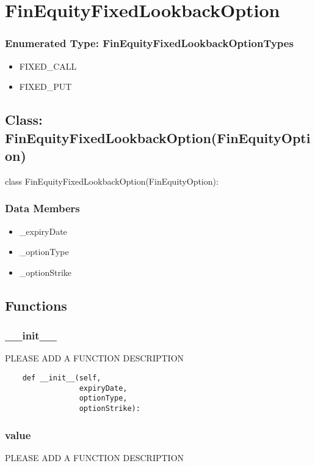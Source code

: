 \documentclass[twoside,11pt]{book}
\begin{document}
\newpage
\section{FinEquityFixedLookbackOption}

\subsubsection{Enumerated Type: FinEquityFixedLookbackOptionTypes}
\begin{itemize}
\item{FIXED\_CALL}
\item{FIXED\_PUT}
\end{itemize}

\subsection*{Class: FinEquityFixedLookbackOption(FinEquityOption)}
class FinEquityFixedLookbackOption(FinEquityOption): 

\subsubsection*{Data Members}
\begin{itemize}
\item{\_expiryDate}
\item{\_optionType}
\item{\_optionStrike}
\end{itemize}

\subsection*{Functions}

\subsubsection*{{\bf \_\_init\_\_}}
PLEASE ADD A FUNCTION DESCRIPTION

\begin{lstlisting}
    def __init__(self,
                 expiryDate,
                 optionType,
                 optionStrike):
\end{lstlisting}

\subsubsection*{{\bf value}}
PLEASE ADD A FUNCTION DESCRIPTION
\end{document}
